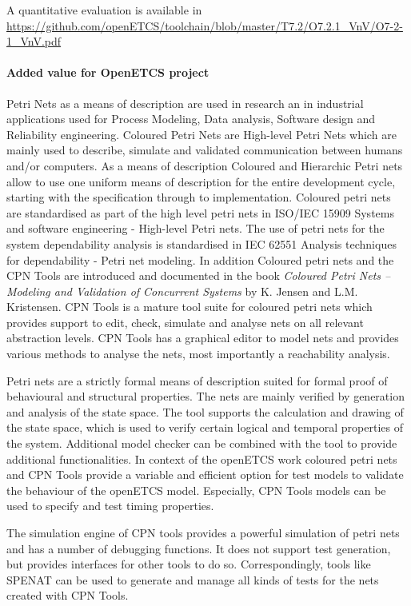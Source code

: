 A quantitative evaluation is available in \url{https://github.com/openETCS/toolchain/blob/master/T7.2/O7.2.1_VnV/O7-2-1_VnV.pdf}

\paragraph{Added value for OpenETCS project}

Petri Nets as a means of description are used in research an in industrial applications used for Process Modeling, Data analysis, Software design and Reliability engineering. Coloured Petri Nets are  High-level Petri Nets which are mainly used to describe, simulate and validated communication between humans and/or computers. As a means of description Coloured and  Hierarchic Petri nets allow to use one uniform means of description for the entire development cycle, starting with  the specification through to  implementation. 
Coloured petri nets are standardised as part of the high level petri nets in ISO/IEC 15909 Systems and software engineering - High-level Petri nets. The use of petri nets for the system dependability analysis is standardised in IEC 62551 Analysis techniques for dependability - Petri net modeling. In addition Coloured petri nets and the CPN Tools are introduced and documented in the book \textit{Coloured Petri Nets -- Modeling and Validation of Concurrent Systems} by K. Jensen and L.M. Kristensen. CPN Tools is a mature tool suite for coloured petri nets which provides support to edit, check, simulate and analyse nets on all relevant abstraction levels. CPN Tools has a graphical editor to model nets and provides various methods to analyse the nets, most importantly a reachability analysis. 

Petri nets are a strictly formal means of description suited for formal proof of behavioural and structural properties. The nets are mainly verified by generation and analysis of the state space. The tool supports the calculation and drawing of the state space, which is used to verify certain logical and temporal properties of the system. Additional model checker can be combined with the tool to provide additional functionalities. In context of the openETCS work coloured petri nets and CPN Tools provide a variable and efficient option for test models to validate the behaviour of the openETCS model. Especially, CPN Tools models can be used to specify and test timing properties.

The simulation engine of CPN tools provides a powerful simulation of petri nets and has a number of debugging functions. It does not support test generation, but provides interfaces for other tools to do so. Correspondingly, tools like SPENAT can be used to generate and manage all kinds of tests for the nets created with CPN Tools. 

